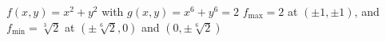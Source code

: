 {$f(x,y) = x^2 + y^2$ with $g(x,y) = x^6 + y^6 = 2$
}
{$f_{\text{max}} = 2$ at $\left( \pm 1, \pm 1 \right)$, and $f_{\text{min}} = \sqrt[3]{2}$ at $\left( \pm \sqrt[6]{2}, 0 \right)$ and $\left(0, \pm \sqrt[6]{2}\right)$}